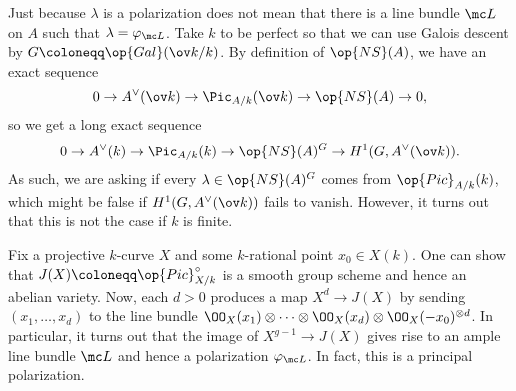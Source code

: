 \documentclass[../notes.tex]{subfiles}
\begin{document}
\begin{remark}
	Just because $\lambda$ is a polarization does not mean that there is a line bundle $\mc L$ on $A$ such that $\lambda=\varphi_{\mc L}$. Take $k$ to be perfect so that we can use Galois descent by $G\coloneqq\op{Gal}(\ov k/k)$. By definition of $\op{NS}(A)$, we have an exact sequence
	\[0\to A^\lor(\ov k)\to\Pic_{A/k}(\ov k)\to\op{NS}(A)\to0,\]
	so we get a long exact sequence
	\[0\to A^\lor (k)\to\Pic_{A/k}(k)\to\op{NS}(A)^G\to H^1(G,A^\lor(\ov k)).\]
	As such, we are asking if every $\lambda\in\op{NS}(A)^G$ comes from $\op{Pic}_{A/k}(k)$, which might be false if $H^1(G,A^\lor(\ov k))$ fails to vanish. However, it turns out that this is not the case if $k$ is finite.
\end{remark}
\begin{remark}
	Fix a projective $k$-curve $X$ and some $k$-rational point $x_0\in X(k)$. One can show that $J(X)\coloneqq\op{Pic}_{X/k}^\circ$ is a smooth group scheme and hence an abelian variety. Now, each $d>0$ produces a map $X^d\to J(X)$ by sending $(x_1,\ldots,x_d)$ to the line bundle $\OO_X(x_1)\otimes\cdots\otimes\OO_X(x_d)\otimes\OO_X(-x_0)^{\otimes d}$. In particular, it turns out that the image of $X^{g-1}\to J(X)$ gives rise to an ample line bundle $\mc L$ and hence a polarization $\varphi_{\mc L}$. In fact, this is a principal polarization.
\end{remark}
\end{document}
